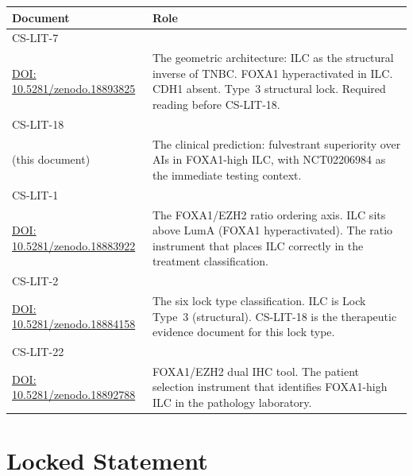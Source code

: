 \documentclass[12pt, a4paper]{article}
\begin{document}
\begin{center}
\begin{tabular}{p{2.8cm}p{8.5cm}}
\toprule
\textbf{Document} & \textbf{Role} \\
\midrule
CS-LIT-7\\
\href{https://doi.org/10.5281/zenodo.18893825}
{DOI: 10.5281/zenodo.18893825} &
The geometric architecture: ILC as the structural
inverse of TNBC. FOXA1 hyperactivated in ILC.
CDH1 absent. Type~3 structural lock. Required
reading before CS-LIT-18. \\[0.5em]
CS-LIT-18\\(this document) &
The clinical prediction: fulvestrant superiority
over AIs in FOXA1-high ILC, with NCT02206984 as
the immediate testing context. \\[0.5em]
CS-LIT-1\\
\href{https://doi.org/10.5281/zenodo.18883922}
{DOI: 10.5281/zenodo.18883922} &
The FOXA1/EZH2 ratio ordering axis. ILC sits
above LumA (FOXA1 hyperactivated). The ratio
instrument that places ILC correctly in the
treatment classification. \\[0.5em]
CS-LIT-2\\
\href{https://doi.org/10.5281/zenodo.18884158}
{DOI: 10.5281/zenodo.18884158} &
The six lock type classification. ILC is Lock
Type~3 (structural). CS-LIT-18 is the therapeutic
evidence document for this lock type. \\[0.5em]
CS-LIT-22\\
\href{https://doi.org/10.5281/zenodo.18892788}
{DOI: 10.5281/zenodo.18892788} &
FOXA1/EZH2 dual IHC tool. The patient selection
instrument that identifies FOXA1-high ILC in the
pathology laboratory. \\
\bottomrule
\end{tabular}
\end{center}

\section{Locked Statement}
\end{document}
